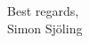 \documentclass[a4paper,11pt]{letter}
\begin{document}


Best regards,\\
Simon Sjöling
\end{document}
